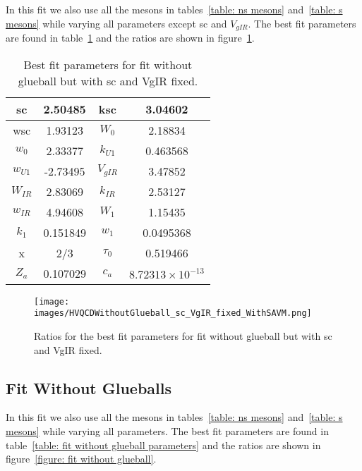 \documentclass[a4paper,12pt]{article}
\begin{document}
In this fit we also use all the mesons in tables~\ref{table: ns mesons} and~\ref{table: s mesons} while varying all parameters except sc and $V_{gIR}$. The best fit parameters are found in table~\ref{table: fit without glueball sc VgIR fixed parameters} and the ratios are shown in figure~\ref{figure: fit without glueball sc VgIR fixed}.

\begin{table}
\centering
\begin{tabular}{ | c | c | c | c |}
\hline
sc & 2.50485 & ksc & 3.04602 \\
\hline
wsc & 1.93123 & $W_0$ & 2.18834 \\
\hline
$w_0$ & 2.33377 & $k_{U1}$ & 0.463568 \\
\hline
$w_{U1}$ & -2.73495 & $V_{gIR}$ & 3.47852 \\
\hline
$W_{IR}$ & 2.83069 & $k_{IR}$ & 2.53127 \\
\hline
$w_{IR}$ & 4.94608 & $W_1$ & 1.15435\\
\hline
$k_1$ & 0.151849 & $w_1$ & 0.0495368\\
\hline
x & 2/3 & $\tau_0$ & 0.519466\\
\hline
$Z_a$ & 0.107029 & $c_a$ & $8.72313 \times 10^{-13}$\\
\hline
\end{tabular}
\caption{Best fit parameters for fit without glueball but with sc and VgIR fixed.}
\label{table: fit without glueball sc VgIR fixed parameters} 
\end{table}

\begin{figure}
  \center
  \texttt{[image: images/HVQCDWithoutGlueball\_sc\_VgIR\_fixed\_WithSAVM.png]} 
  \caption{Ratios for the best fit parameters for fit without glueball but with sc and VgIR fixed.}
  \label{figure: fit without glueball sc VgIR fixed}
\end{figure}

\subsection{Fit Without Glueballs}

In this fit we also use all the mesons in tables~\ref{table: ns mesons} and~\ref{table: s mesons} while varying all parameters. The best fit parameters are found in table~\ref{table: fit without glueball parameters} and the ratios are shown in figure~\ref{figure: fit without glueball}.
\end{document}
